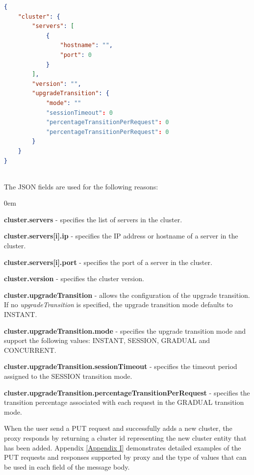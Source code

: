 \documentclass[a4paper,11pt,twoside]{article}
\begin{document}
\begin{lstlisting}[language=json]
{
    "cluster": {
        "servers": [
            {
                "hostname": "", 
                "port": 0
            }
        ], 
        "version": "", 
        "upgradeTransition": {
            "mode": ""
            "sessionTimeout": 0  
            "percentageTransitionPerRequest": 0
            "percentageTransitionPerRequest": 0  
        }
    }
}
\end{lstlisting}

\noindent\\
The JSON fields are used for the following reasons:

\begin{list}{-}{}
  \itemsep0em
  \item\textbf{{cluster.servers}} - specifies the list of servers in the cluster.
  
  \item\textbf{{cluster.servers[i].ip}} - specifies the IP address or hostname of a server in the cluster.
  
  \item\textbf{{cluster.servers[i].port}} - specifies the port of a server in the cluster.
  
  \item\textbf{{cluster.version}} - specifies the cluster version. 
  
  \item\textbf{{cluster.upgradeTransition}} - allows the configuration of the upgrade transition. If no \textit{upgradeTransition} is specified, the upgrade transition mode defaults to INSTANT.  
  
  \item\textbf{{cluster.upgradeTransition.mode}} - specifies the upgrade transition mode and support the following values: INSTANT, SESSION, GRADUAL and CONCURRENT.
   
  \item\textbf{{cluster.upgradeTransition.sessionTimeout}} - specifies the timeout period assigned to the SESSION transition mode.
  
  \item\textbf{{cluster.upgradeTransition.percentageTransitionPerRequest}} - specifies the transition percentage associated with each request in the GRADUAL transition mode.
\end{list}

\noindent
When the user send a PUT request and successfully adds a new cluster, the proxy responds by returning a cluster id representing the new cluster entity that has been added. Appendix \ref{Appendix  I} demonstrates detailed examples of the PUT requests and responses supported by proxy and the type of values that can be used in each field of the message body.
\end{document}

